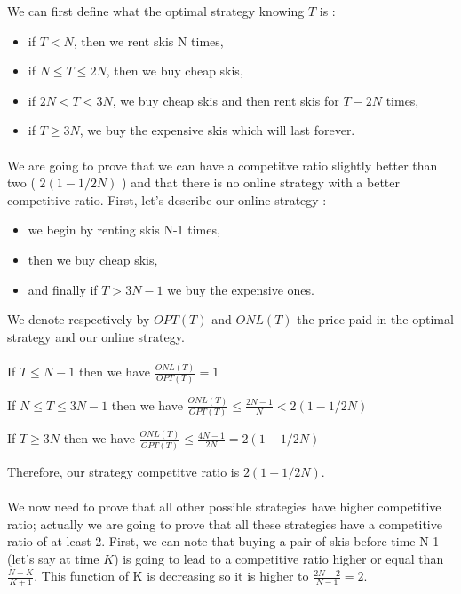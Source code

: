We can first define what the optimal strategy knowing $T$ is :
\begin{itemize}
	\item if $T<N$, then we rent skis N times,
	\item if $N\leqslant T \leqslant 2N$, then we buy cheap skis,
	\item if $2N<T<3N$, we buy cheap skis and then rent skis for $T-2N$ times,
	\item if $T\geqslant 3N$, we buy the expensive skis which will last forever.
\end{itemize}

\paragraph{}
We are going to prove that we can have a competitve ratio slightly better than two ( $2(1-1/2N)$ ) and that there is no online strategy with a better competitive ratio.
First, let's describe our online strategy : 
\begin{itemize}
	\item we begin by renting skis N-1 times,
	\item then we buy cheap skis,
	\item and finally if $T>3N-1$ we buy the expensive ones.
\end{itemize}


We denote respectively by $OPT(T)$ and $ONL(T)$ the price paid in the optimal strategy and our online strategy.

\paragraph{}
If $T \leqslant N-1$ then we have $\frac{ONL(T)}{OPT(T)} = 1$

If $N\leqslant T\leqslant3N-1$ then we have $\frac{ONL(T)}{OPT(T)} \leqslant \frac{2N-1}{N} < 2(1-1/2N)$

If $T \geqslant 3N$ then we have $\frac{ONL(T)}{OPT(T)} \leqslant \frac{4N-1}{2N} = 2(1-1/2N)$

Therefore, our strategy competitve ratio is $2(1-1/2N)$. 
\paragraph{}
We now need to prove that all other possible strategies have higher competitive ratio; actually we are going to prove that all these strategies have a competitive ratio of at least 2. First, we can note that buying a pair of skis before time N-1 (let's say at time $K$) is going to lead to a competitive ratio higher or equal than $\frac{N+K}{K+1}$. This function of K is decreasing so it is higher to $\frac{2N-2}{N-1}=2$.

